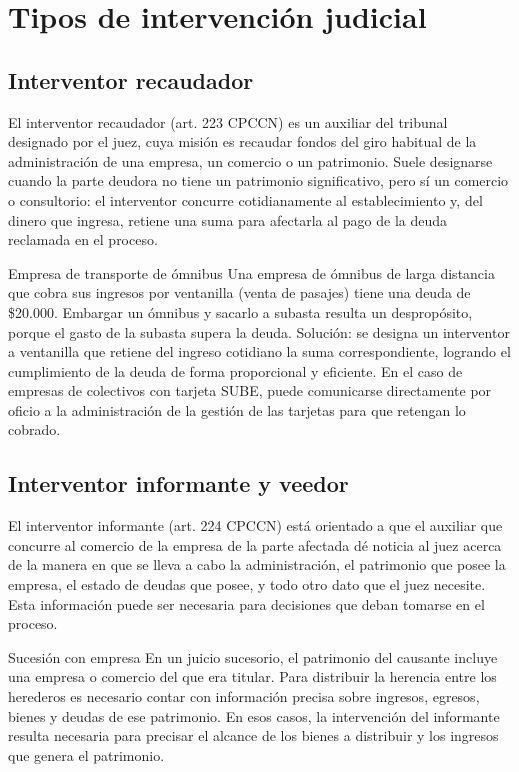 \documentclass[12pt,oneside]{book}
\begin{document}
\section{Tipos de intervención judicial}

\subsection{Interventor recaudador}

El interventor recaudador (art. 223 CPCCN) es un auxiliar del tribunal designado por el juez, cuya misión es recaudar fondos del giro habitual de la administración de una empresa, un comercio o un patrimonio. Suele designarse cuando la parte deudora no tiene un patrimonio significativo, pero sí un comercio o consultorio: el interventor concurre cotidianamente al establecimiento y, del dinero que ingresa, retiene una suma para afectarla al pago de la deuda reclamada en el proceso.

\begin{example}{Empresa de transporte de ómnibus}
Una empresa de ómnibus de larga distancia que cobra sus ingresos por ventanilla (venta de pasajes) tiene una deuda de \$20.000. Embargar un ómnibus y sacarlo a subasta resulta un despropósito, porque el gasto de la subasta supera la deuda. Solución: se designa un interventor a ventanilla que retiene del ingreso cotidiano la suma correspondiente, logrando el cumplimiento de la deuda de forma proporcional y eficiente. En el caso de empresas de colectivos con tarjeta SUBE, puede comunicarse directamente por oficio a la administración de la gestión de las tarjetas para que retengan lo cobrado.
\end{example}

\subsection{Interventor informante y veedor}

El interventor informante (art. 224 CPCCN) está orientado a que el auxiliar que concurre al comercio de la empresa de la parte afectada dé noticia al juez acerca de la manera en que se lleva a cabo la administración, el patrimonio que posee la empresa, el estado de deudas que posee, y todo otro dato que el juez necesite. Esta información puede ser necesaria para decisiones que deban tomarse en el proceso.

\begin{example}{Sucesión con empresa}
En un juicio sucesorio, el patrimonio del causante incluye una empresa o comercio del que era titular. Para distribuir la herencia entre los herederos es necesario contar con información precisa sobre ingresos, egresos, bienes y deudas de ese patrimonio. En esos casos, la intervención del informante resulta necesaria para precisar el alcance de los bienes a distribuir y los ingresos que genera el patrimonio.
\end{example}
\end{document}

